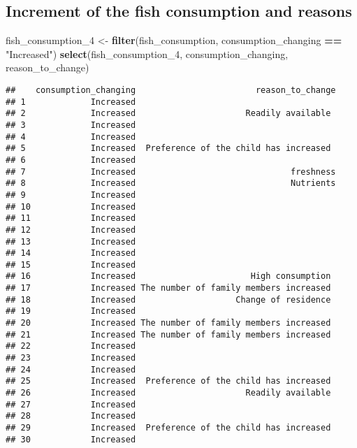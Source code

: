 \documentclass[
]{article}
\newenvironment{Shaded}{\begin{snugshade}}{\end{snugshade}}
\newcommand{\FunctionTok}[1]{\textcolor[rgb]{0.13,0.29,0.53}{\textbf{#1}}}
\newcommand{\NormalTok}[1]{#1}
\newcommand{\OtherTok}[1]{\textcolor[rgb]{0.56,0.35,0.01}{#1}}
\newcommand{\SpecialCharTok}[1]{\textcolor[rgb]{0.81,0.36,0.00}{\textbf{#1}}}
\newcommand{\StringTok}[1]{\textcolor[rgb]{0.31,0.60,0.02}{#1}}
\begin{document}
\hypertarget{increment-of-the-fish-consumption-and-reasons}{%
\subsection{Increment of the fish consumption and
reasons}\label{increment-of-the-fish-consumption-and-reasons}}

\begin{Shaded}
\begin{Highlighting}[]
\NormalTok{fish\_consumption\_4 }\OtherTok{\textless{}{-}} \FunctionTok{filter}\NormalTok{(fish\_consumption, consumption\_changing }\SpecialCharTok{==} \StringTok{"Increased"}\NormalTok{)}
                         \FunctionTok{select}\NormalTok{(fish\_consumption\_4, consumption\_changing, reason\_to\_change)}
\end{Highlighting}
\end{Shaded}

\begin{verbatim}
##    consumption_changing                        reason_to_change
## 1             Increased                                        
## 2             Increased                      Readily available 
## 3             Increased                                        
## 4             Increased                                        
## 5             Increased  Preference of the child has increased 
## 6             Increased                                        
## 7             Increased                               freshness
## 8             Increased                               Nutrients
## 9             Increased                                        
## 10            Increased                                        
## 11            Increased                                        
## 12            Increased                                        
## 13            Increased                                        
## 14            Increased                                        
## 15            Increased                                        
## 16            Increased                       High consumption 
## 17            Increased The number of family members increased 
## 18            Increased                    Change of residence 
## 19            Increased                                        
## 20            Increased The number of family members increased 
## 21            Increased The number of family members increased 
## 22            Increased                                        
## 23            Increased                                        
## 24            Increased                                        
## 25            Increased  Preference of the child has increased 
## 26            Increased                      Readily available 
## 27            Increased                                        
## 28            Increased                                        
## 29            Increased  Preference of the child has increased 
## 30            Increased
\end{verbatim}
\end{document}
